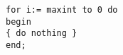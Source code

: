 \documentclass{article}
\begin{document}
\lstset{language=Pascal}

\begin{lstlisting}
for i:= maxint to 0 do
begin
{ do nothing }
end;
\end{lstlisting}
\end{document}

